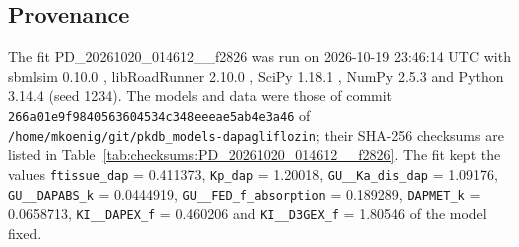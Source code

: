 \documentclass{article}
\begin{document}
\subsection{Provenance}

The fit PD\_20261020\_014612\_\_f2826 was run on 2026-10-19 23:46:14 UTC with sbmlsim 0.10.0 \cite{Koenig2026_sbmlsim}, libRoadRunner 2.10.0 \cite{Welsh2023}, SciPy 1.18.1 \cite{Virtanen2020}, NumPy 2.5.3 \cite{Harris2020} and Python 3.14.4 (seed 1234). The models and data were those of commit \texttt{266a01e9f9840563604534c348eeeae5ab4e3a46} of \texttt{/home/mkoenig/git/pkdb\_models-dapagliflozin}; their SHA-256 checksums are listed in Table~\ref{tab:checksums:PD_20261020_014612__f2826}. The fit kept the values \texttt{ftissue\_dap} = 0.411373, \texttt{Kp\_dap} = 1.20018, \texttt{GU\_\_Ka\_dis\_dap} = 1.09176, \texttt{GU\_\_DAPABS\_k} = 0.0444919, \texttt{GU\_\_FED\_f\_absorption} = 0.189289, \texttt{DAPMET\_k} = 0.0658713, \texttt{KI\_\_DAPEX\_f} = 0.460206 and \texttt{KI\_\_D3GEX\_f} = 1.80546 of the model fixed.
\end{document}
